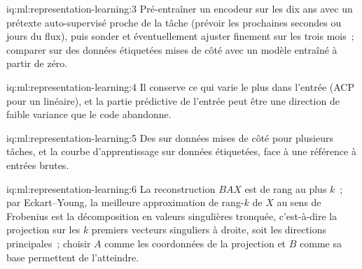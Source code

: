 \begin{solution}{iq:ml:representation-learning:3}
Pré-entraîner un encodeur sur les dix ans avec un prétexte auto-supervisé proche de la tâche (prévoir les prochaines secondes ou
jours du flux), puis sonder et éventuellement ajuster finement sur les trois mois~; comparer sur des données étiquetées mises de côté avec un modèle
entraîné à partir de zéro.
\end{solution}

\begin{solution}{iq:ml:representation-learning:4}
Il conserve ce qui varie le plus dans l'entrée (ACP pour un  linéaire), et la partie prédictive de l'entrée peut être une
direction de faible variance que le code abandonne.
\end{solution}

\begin{solution}{iq:ml:representation-learning:5}
Des  sur données mises de côté pour plusieurs tâches, et la courbe d'apprentissage sur données étiquetées, face à une référence à entrées brutes.
\end{solution}

\begin{solution}{iq:ml:representation-learning:6}
La reconstruction $BAX$ est de rang au plus $k$~; par Eckart--Young, la meilleure approximation de rang-$k$ de $X$ au sens de Frobenius est la
décomposition en valeurs singulières tronquée, c'est-à-dire la projection sur les $k$ premiers vecteurs singuliers à droite, soit les directions principales~; choisir $A$ comme
les coordonnées de la projection et $B$ comme sa base permettent de l'atteindre.
\end{solution}

